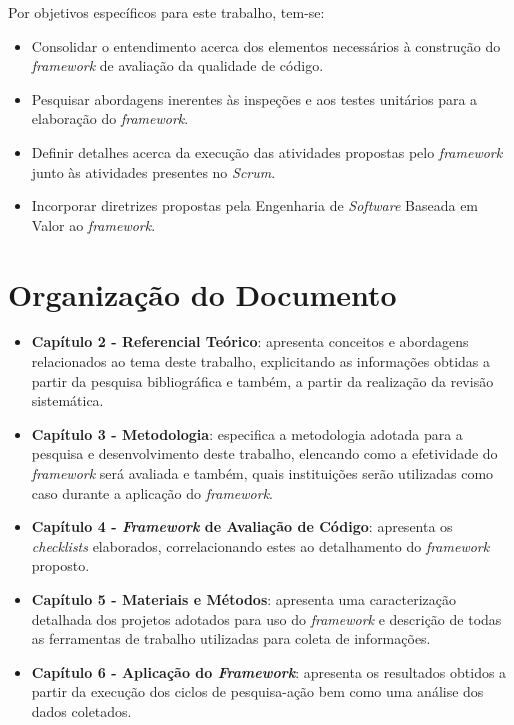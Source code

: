 Por objetivos específicos para este trabalho, tem-se:

\begin{itemize}
	\item Consolidar o entendimento acerca dos elementos necessários à construção do \textit{framework} de avaliação da qualidade de código.
	\item Pesquisar abordagens inerentes às inspeções e aos testes unitários para a elaboração do \textit{framework}.
	\item Definir detalhes acerca da execução das atividades propostas pelo \textit{framework} junto às atividades presentes no \textit{Scrum}.
	\item Incorporar diretrizes propostas pela Engenharia de \textit{Software} Baseada em Valor ao \textit{framework}.
\end{itemize}

\section{Organização do Documento}

\begin{itemize}
	\item \textbf{Capítulo 2 - Referencial Teórico}: apresenta conceitos e abordagens relacionados ao tema deste trabalho, explicitando as informações obtidas a partir da pesquisa bibliográfica e também, a partir da realização da revisão sistemática.

	\item \textbf{Capítulo 3 - Metodologia}: especifica a metodologia adotada para a pesquisa e desenvolvimento deste trabalho, elencando como a efetividade do \textit{framework} será avaliada e também, quais instituições serão utilizadas como caso durante a aplicação do \textit{framework}.

	\item \textbf{Capítulo 4 - \textit{Framework} de Avaliação de Código}: apresenta os \textit{checklists} elaborados, correlacionando estes ao detalhamento do \textit{framework} proposto.

	\item \textbf{Capítulo 5 - Materiais e Métodos}: apresenta uma caracterização detalhada dos projetos adotados para uso do \textit{framework} e descrição de todas as ferramentas de trabalho utilizadas para coleta de informações.

	\item \textbf{Capítulo 6 - Aplicação do \textit{Framework}}: apresenta os resultados obtidos a partir da execução dos ciclos de pesquisa-ação bem como uma análise dos dados coletados.
\end{itemize}